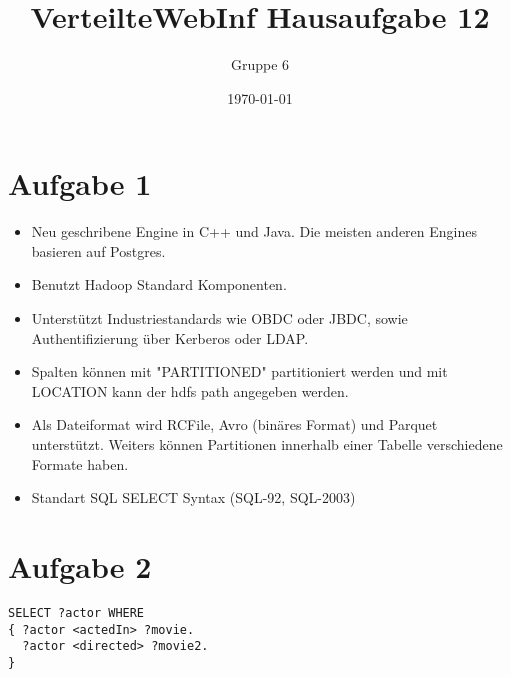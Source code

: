 \documentclass[a4paper]{scrartcl}
\author{Gruppe 6}
\title{\textbf{VerteilteWebInf Hausaufgabe 12}}
\date{\today}
\begin{document}
\maketitle

\section*{Aufgabe 1}
\begin{itemize}
\item Neu geschribene Engine in C++ und Java. Die meisten anderen Engines basieren auf Postgres.
\item Benutzt Hadoop Standard Komponenten.
\item Unterstützt Industriestandards wie  OBDC oder JBDC, sowie Authentifizierung über Kerberos oder LDAP.
\item Spalten können mit "PARTITIONED" partitioniert werden und mit LOCATION kann der hdfs path angegeben werden.
\item Als Dateiformat wird RCFile, Avro (binäres Format) und Parquet unterstützt. Weiters können Partitionen innerhalb einer Tabelle verschiedene Formate haben.
\item Standart SQL SELECT Syntax (SQL-92, SQL-2003)

\end{itemize}

\section*{Aufgabe 2}
\begin{verbatim}
SELECT ?actor WHERE
{ ?actor <actedIn> ?movie.
  ?actor <directed> ?movie2.
}
\end{verbatim}
\end{document}
